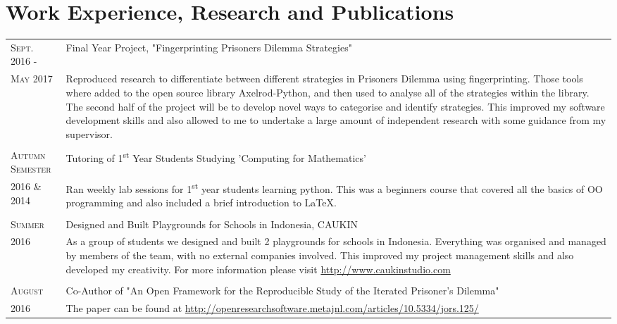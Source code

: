 \documentclass[a4paper]{article}
\begin{document}
\section{Work Experience, Research and Publications}
\begin{tabularx}{\textwidth}{lX}

\textsc{Sept. 2016 - } & Final Year Project, "Fingerprinting Prisoners Dilemma Strategies"\\
\textsc{May 2017} & \footnotesize{Reproduced research to differentiate between different strategies in Prisoners Dilemma using fingerprinting. Those tools where added to the open source library Axelrod-Python, and then used to analyse all of the strategies within the library. The second half of the project will be to develop novel ways to categorise and identify strategies. This improved my software development skills and also allowed to me to undertake a large amount of independent research with some guidance from my supervisor.}
\\
\\
\textsc{Autumn Semester} & Tutoring of 1\textsuperscript{st} Year Students Studying 'Computing for Mathematics'\\
\textsc{2016 \& 2014} & \footnotesize{Ran weekly lab sessions for 1\textsuperscript{st} year students learning python. This was a beginners course that covered all the basics of OO programming and also included a brief introduction to \LaTeX.}
\\
\\
\textsc{Summer} & Designed and Built Playgrounds for Schools in Indonesia, CAUKIN \\
\textsc{2016} & \footnotesize{As a group of students we designed and built 2 playgrounds for schools in Indonesia. Everything was organised and managed by members of the team, with no external companies involved. This improved my project management skills and also developed my creativity. For more information please visit \url{http://www.caukinstudio.com}}
\\
\\
\textsc{August} & Co-Author of "An Open Framework for the Reproducible Study of the Iterated Prisoner’s Dilemma" \\
\textsc{2016} & \footnotesize{The paper can be found at \url{http://openresearchsoftware.metajnl.com/articles/10.5334/jors.125/}}

\end{tabularx}
\end{document}
